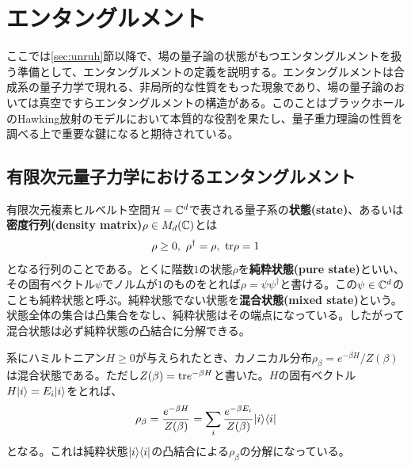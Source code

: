 \section{エンタングルメント}\label{sec:entanglement}
ここでは\ref{sec:unruh}節以降で、場の量子論の状態がもつエンタングルメントを扱う準備として、エンタングルメントの定義を説明する。エンタングルメントは合成系の量子力学で現れる、非局所的な性質をもった現象であり、場の量子論のおいては真空ですらエンタングルメントの構造がある。このことはブラックホールのHawking放射のモデルにおいて本質的な役割を果たし、量子重力理論の性質を調べる上で重要な鍵になると期待されている。

\subsection{有限次元量子力学におけるエンタングルメント}
有限次元複素ヒルベルト空間$\mathcal{H}=\mathbb{C}^d$で表される量子系の\textbf{状態(state)}、あるいは\textbf{密度行列(density matrix)}$\rho\in M_d(\mathbb{C})$とは
\begin{align}
\rho \geq 0,\  \rho^\dagger = \rho,\  \textnormal{tr} \rho=1
\end{align}
となる行列のことである。とくに階数$1$の状態$\rho$を\textbf{純粋状態(pure state)}といい、その固有ベクトル$\psi$でノルムが$1$のものをとれば$\rho=\psi\psi^\dagger$と書ける。この$\psi\in\mathbb{C}^d$のことも純粋状態と呼ぶ。純粋状態でない状態を\textbf{混合状態(mixed state)}という。状態全体の集合は凸集合をなし、純粋状態はその端点になっている。したがって混合状態は必ず純粋状態の凸結合に分解できる。
\begin{ex}
	系にハミルトニアン$H\geq 0$が与えられたとき、カノニカル分布$\rho_\beta=e^{-\beta H}/Z(\beta)$は混合状態である。ただし$Z(\beta)=\textnormal{tr} e^{-\beta H}$と書いた。$H$の固有ベクトル$H|i\rangle=E_i|i\rangle$をとれば、
	\begin{align}
	\rho_\beta=\frac{e^{-\beta H}}{Z(\beta)}=\sum_{i}\frac{e^{-\beta E_i}}{Z(\beta)}|i\rangle\langle i|
	\end{align}
	となる。これは純粋状態$|i\rangle\langle i|$の凸結合による$\rho_\beta$の分解になっている。
\end{ex}


